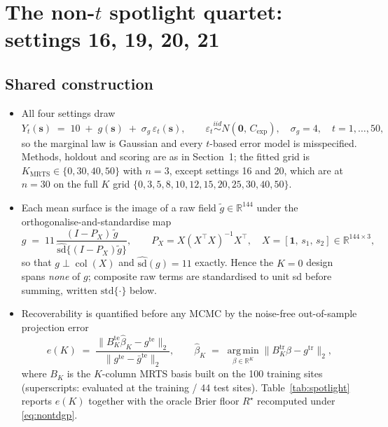 \documentclass[11pt]{article}
\newcommand{\bs}{\boldsymbol{s}}
\newcommand{\R}{\mathbb{R}}
\newcommand{\Kmrts}{K_{\mathrm{MRTS}}}
\begin{document}
\section{The non-$t$ spotlight quartet: settings 16, 19, 20, 21}
\label{sec:spotlight}

\subsection*{Shared construction}

\begin{itemize}
\item All four settings draw
\begin{equation}
Y_t(\bs) \;=\; 10 \;+\; g(\bs) \;+\; \sigma_g\,\varepsilon_t(\bs),
\qquad \varepsilon_t \stackrel{iid}{\sim} N(\boldsymbol 0,\, C_{\mathrm{exp}}),
\quad \sigma_g = 4,\quad t = 1,\dots,50,
\label{eq:nontdgp}
\end{equation}
so the marginal law is Gaussian and every $t$-based error model is
misspecified. Methods, holdout and scoring are as in Section~1; the fitted
grid is $\Kmrts \in \{0, 30, 40, 50\}$ with $n = 3$, except settings 16 and 20,
which are at $n = 30$ on the full $K$ grid $\{0,3,5,8,10,12,15,20,25,30,40,50\}$.
\item Each mean surface is the image of a raw field
$\tilde g \in \R^{144}$ under the orthogonalise-and-standardise map
\begin{equation}
g \;=\; 11\,\frac{(I - P_X)\,\tilde g}
{\widehat{\mathrm{sd}}\{(I - P_X)\tilde g\}},
\qquad P_X = X(X^\top X)^{-1}X^\top,\quad
X = [\boldsymbol 1,\, s_1,\, s_2] \in \R^{144 \times 3},
\label{eq:orthostd}
\end{equation}
so that $g \perp \operatorname{col}(X)$ and
$\widehat{\mathrm{sd}}(g) = 11$ exactly. Hence the $K = 0$ design spans
\emph{none} of $g$; composite raw terms are standardised to unit sd before
summing, written $\mathrm{std}\{\cdot\}$ below.
\item Recoverability is quantified before any MCMC by the noise-free
out-of-sample projection error
\begin{equation}
e(K) \;=\;
\frac{\lVert B_K^{\mathrm{te}}\hat\beta_K - g^{\mathrm{te}}\rVert_2}
     {\lVert g^{\mathrm{te}} - \bar g^{\mathrm{te}}\rVert_2},
\qquad
\hat\beta_K \;=\; \operatorname*{arg\,min}_{\beta \in \R^{K}}
\lVert B_K^{\mathrm{tr}}\beta - g^{\mathrm{tr}}\rVert_2,
\label{eq:projerr}
\end{equation}
where $B_K$ is the $K$-column MRTS basis built on the 100 training sites
(superscripts: evaluated at the training / 44 test sites).
Table~\ref{tab:spotlight} reports $e(K)$ together with the oracle Brier
floor $R^\star$ recomputed under \eqref{eq:nontdgp}.
\end{itemize}
\end{document}
